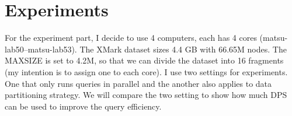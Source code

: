 \section{Experiments}

For the experiment part, I decide to use 4 computers, each has 4 cores
(matsu-lab50--matsu-lab53). The XMark dataset sizes 4.4 GB with 66.65M nodes.
The MAXSIZE is set to 4.2M, so that we can divide the dataset into 16 fragments
(my intention is to assign one to each core). I use two settings for
experiments. One that only runs queries in parallel and the another also applies
to data partitioning strategy. We will compare the two setting to show how much
DPS can be used to improve the query efficiency.

